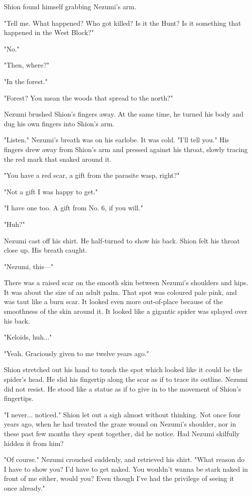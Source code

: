 Shion found himself grabbing Nezumi's arm.

"Tell me. What happened? Who got killed? Is it the Hunt? Is it something
that happened in the West Block?"

"No."

"Then, where?"

"In the forest."

"Forest? You mean the woods that spread to the north?"

Nezumi brushed Shion's fingers away. At the same time, he turned his
body and dug his own fingers into Shion's arm.

"Listen." Nezumi's breath was on his earlobe. It was cold. "I'll tell
you." His fingers drew away from Shion's arm and pressed against his
throat, slowly tracing the red mark that snaked around it.

"You have a red scar, a gift from the parasite wasp, right?"

"Not a gift I was happy to get."

"I have one too. A gift from No. 6, if you will."

"Huh?"

Nezumi cast off his shirt. He half-turned to show his back. Shion felt
his throat close up. His breath caught.

"Nezumi, this---"

There was a raised scar on the smooth skin between Nezumi's shoulders
and hips. It was about the size of an adult palm. That spot was coloured
pale pink, and was taut like a burn scar. It looked even more
out-of-place because of the smoothness of the skin around it. It looked
like a gigantic spider was splayed over his back.

"Keloids, huh..."

"Yeah. Graciously given to me twelve years ago."

Shion stretched out his hand to touch the spot which looked like it
could be the spider's head. He slid his fingertip along the scar as if
to trace its outline. Nezumi did not resist. He stood like a statue as
if to give in to the movement of Shion's fingertips.

"I never... noticed." Shion let out a sigh almost without thinking. Not
once four years ago, when he had treated the graze wound on Nezumi's
shoulder, nor in these past few months they spent together, did he
notice. Had Nezumi skilfully hidden it from him?

"Of course." Nezumi crouched suddenly, and retrieved his shirt. "What
reason do I have to show you? I'd have to get naked. You wouldn't wanna
be stark naked in front of me either, would you? Even though I've had
the privilege of seeing it once already."

